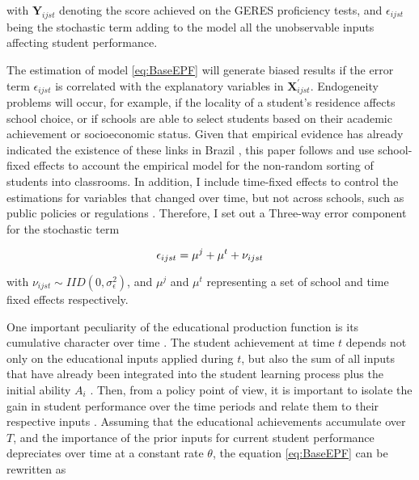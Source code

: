 \documentclass[a4paper, 12pt]{article}
\begin{document}
with $\mathbf{Y}_{ijst}$ denoting the score achieved on the GERES proficiency tests, and $\epsilon_{ijst}$ being the stochastic term adding to the model all the unobservable inputs affecting student performance. 




The estimation of model \eqref{eq:BaseEPF} will generate biased results if the error term $\epsilon_{ijst}$ is correlated with the explanatory variables in $\mathbf{X}_{ijst}^{\prime}$. Endogeneity problems will occur, for example, if the locality of a student’s residence affects school choice, or if schools are able to select students based on their academic achievement or socioeconomic status. Given that empirical evidence has already indicated the existence of these links in Brazil \citep[see e.g.][]{alves2015seleccao, bartholo2013measuring}, this paper follows \citet{imberman2015incentive, schwerdt2011traditional, wossmann2006class} and use school-fixed effects to account the empirical model for the non-random sorting of students into classrooms. In addition, I include time-fixed effects to control the estimations for variables that changed over time, but not across schools, such as public policies or regulations \citep{deschenes2018quasi}. Therefore, I set out a Three-way error component for the stochastic term 


\begin{equation} \label{eq:ErrorTerm}
\epsilon_{ijst} = \mu^j + \mu^t +  \nu_{ijst} \\
\end{equation}



with $\nu_{ijst} \sim IID(0, \sigma^2_{\epsilon})$, and $\mu^{j}$ and $\mu^{t}$ representing a set of school and time fixed effects respectively. 




One important peculiarity of the educational production function is its cumulative character over time \citep[see e.g.][]{britton2016teacher, andrabi2009value, hanushek2002publicly}. The student achievement at time $t$ depends not only on the educational inputs applied during $t$, but also the sum of all inputs that have already been integrated into the student learning process plus the initial ability $A_i$ \citep{rothstein2010teacher, todd2003specification}. Then, from a policy point of view, it is important to isolate the gain in student performance over the time periods and relate them to their respective inputs \citep{hanushek2012distribution, andrabi2009value}. Assuming that the educational achievements accumulate over $T$, and the importance of the prior inputs for current student performance depreciates over time at a constant rate $\theta$, the equation \eqref{eq:BaseEPF} can be rewritten as
\end{document}
